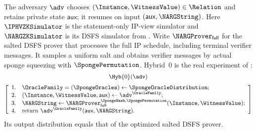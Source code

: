 \begin{definition}
The adversary \(\adv\) chooses \((\Instance,\WitnessValue)\in\Relation\) and retains private state \(\mathsf{aux}\); it resumes on input \((\mathsf{aux},\NARGString)\). Here \(\IPHVZKSimulator\) is the statement-only IP-view simulator and \(\NARGZKSimulator\) is its DSFS simulator from . Write \(\NARGProver_{\mathsf{full}}\) for the salted DSFS prover that processes the full IP schedule, including terminal verifier messages. It samples a uniform salt and obtains verifier messages by actual sponge squeezing with \(\SpongePermutation\). Hybrid~0 is the real experiment of :
\begin{equation*}
\begin{gathered}
  \Hyb{0}(\adv)\\[2pt]
\left[\begin{array}{rl}
  1.& \OracleFamily=(\SpongeOracles)\leftarrow\SpongeOracleDistribution;\\
  2.& (\Instance,\WitnessValue,\mathsf{aux})\leftarrow\adv^{\OracleFamily};\\
  3.& \NARGString\leftarrow\NARGProver_{\mathsf{full}}^{\SpongeHash,\SpongePermutation}(\Instance,\WitnessValue);\\
  4.& \text{return }\adv^{\OracleFamily}(\mathsf{aux},\NARGString).
\end{array}\right]
\end{gathered}
\end{equation*}
Its output distribution equals that of the optimized salted DSFS prover.


\end{definition}
